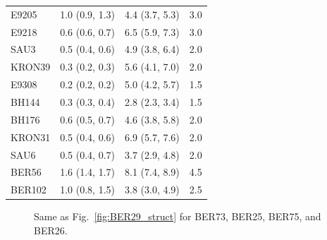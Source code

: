 \documentclass[draft]{aa}
\begin{document}
\begin{appendix}
\begin{table}[h!]
\begin{tabular}{llll}
  E9205         & 1.0 (0.9, 1.3) &  4.4 (3.7, 5.3) &  3.0\\
  E9218         & 0.6 (0.6, 0.7) &  6.5 (5.9, 7.3) &  3.0\\
  SAU3          & 0.5 (0.4, 0.6) &  4.9 (3.8, 6.4) &  2.0\\
  KRON39        & 0.3 (0.2, 0.3) &  5.6 (4.1, 7.0) &  2.0\\
  E9308         & 0.2 (0.2, 0.2) &  5.0 (4.2, 5.7) &  1.5\\
  BH144         & 0.3 (0.3, 0.4) &  2.8 (2.3, 3.4) &  1.5\\
  BH176         & 0.6 (0.5, 0.7) &  4.6 (3.8, 5.8) &  2.0\\
  KRON31        & 0.5 (0.4, 0.6) &  6.9 (5.7, 7.6) &  2.0\\
  SAU6          & 0.5 (0.4, 0.7) &  3.7 (2.9, 4.8) &  2.0\\
  BER56         & 1.6 (1.4, 1.7) &  8.1 (7.4, 8.9) &  4.5\\
  BER102        & 1.0 (0.8, 1.5) &  3.8 (3.0, 4.9) &  2.5\\
 \hline
 \end{tabular}
 \end{table}

 \begin{figure}
  \caption{Same as Fig.~\ref{fig:BER29_struct} for BER73, BER25, BER75, and BER26.}
  \label{fig:0struct}
 \end{figure}


\end{appendix}
\end{document}
